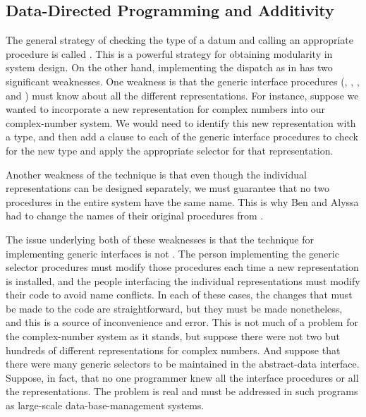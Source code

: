 \subsection{Data-Directed Programming and Additivity}
\label{Section 2.4.3}

The general strategy of checking the type of a datum and calling an appropriate procedure is called .
This is a powerful strategy for obtaining modularity in system design.
On the other hand, implementing the dispatch as in  has two significant weaknesses.
One weakness is that the generic interface procedures (, , , and ) must know about all the different representations.
For instance, suppose we wanted to incorporate a new representation for complex numbers into our complex-number system.
We would need to identify this new representation with a type, and then add a clause to each of the generic interface procedures to check for the new type and apply the appropriate selector for that representation.

Another weakness of the technique is that even though the individual representations can be designed separately, we must guarantee that no two procedures in the entire system have the same name.
This is why Ben and Alyssa had to change the names of their original procedures from .

The issue underlying both of these weaknesses is that the technique for implementing generic interfaces is not .
The person implementing the generic selector procedures must modify those procedures each time a new representation is installed, and the people interfacing the individual representations must modify their code to avoid name conflicts.
In each of these cases, the changes that must be made to the code are straightforward, but they must be made nonetheless, and this is a source of inconvenience and error.
This is not much of a problem for the complex-number system as it stands, but suppose there were not two but hundreds of different representations for complex numbers.
And suppose that there were many generic selectors to be maintained in the abstract-data interface.
Suppose, in fact, that no one programmer knew all the interface procedures or all the representations.
The problem is real and must be addressed in such programs as large-scale data-base-management systems.

